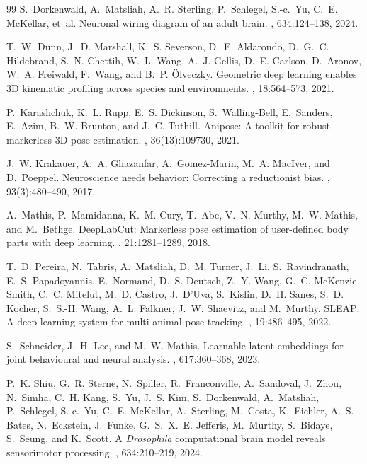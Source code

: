 \documentclass[10pt,twocolumn,letterpaper]{article}
\begin{document}
\begin{thebibliography}{99}
S.~Dorkenwald, A.~Matsliah, A.~R. Sterling, P.~Schlegel, S.-c.~Yu, C.~E. McKellar, et~al.
\newblock Neuronal wiring diagram of an adult brain.
, 634:124--138, 2024.

T.~W. Dunn, J.~D. Marshall, K.~S. Severson, D.~E. Aldarondo, D.~G.~C. Hildebrand, S.~N. Chettih, W.~L. Wang, A.~J. Gellis, D.~E. Carlson, D.~Aronov, W.~A. Freiwald, F.~Wang, and B.~P. {\"O}lveczky.
\newblock Geometric deep learning enables 3D kinematic profiling across species and environments.
, 18:564--573, 2021.

P.~Karashchuk, K.~L. Rupp, E.~S. Dickinson, S.~Walling-Bell, E.~Sanders, E.~Azim, B.~W. Brunton, and J.~C. Tuthill.
\newblock Anipose: A toolkit for robust markerless 3D pose estimation.
, 36(13):109730, 2021.

J.~W. Krakauer, A.~A. Ghazanfar, A.~Gomez-Marin, M.~A. MacIver, and D.~Poeppel.
\newblock Neuroscience needs behavior: Correcting a reductionist bias.
, 93(3):480--490, 2017.

A.~Mathis, P.~Mamidanna, K.~M. Cury, T.~Abe, V.~N. Murthy, M.~W. Mathis, and M.~Bethge.
\newblock DeepLabCut: Markerless pose estimation of user-defined body parts with deep learning.
, 21:1281--1289, 2018.

T.~D. Pereira, N.~Tabris, A.~Matsliah, D.~M. Turner, J.~Li, S.~Ravindranath, E.~S. Papadoyannis, E.~Normand, D.~S. Deutsch, Z.~Y. Wang, G.~C. McKenzie-Smith, C.~C. Mitelut, M.~D. Castro, J.~D'Uva, S.~Kislin, D.~H. Sanes, S.~D. Kocher, S.~S.-H. Wang, A.~L. Falkner, J.~W. Shaevitz, and M.~Murthy.
\newblock SLEAP: A deep learning system for multi-animal pose tracking.
, 19:486--495, 2022.

S.~Schneider, J.~H. Lee, and M.~W. Mathis.
\newblock Learnable latent embeddings for joint behavioural and neural analysis.
, 617:360--368, 2023.

P.~K. Shiu, G.~R. Sterne, N.~Spiller, R.~Franconville, A.~Sandoval, J.~Zhou, N.~Simha, C.~H. Kang, S.~Yu, J.~S. Kim, S.~Dorkenwald, A.~Matsliah, P.~Schlegel, S.-c.~Yu, C.~E. McKellar, A.~Sterling, M.~Costa, K.~Eichler, A.~S. Bates, N.~Eckstein, J.~Funke, G.~S.~X.~E. Jefferis, M.~Murthy, S.~Bidaye, S.~Seung, and K.~Scott.
\newblock A \emph{Drosophila} computational brain model reveals sensorimotor processing.
, 634:210--219, 2024.


\end{thebibliography}
\end{document}
